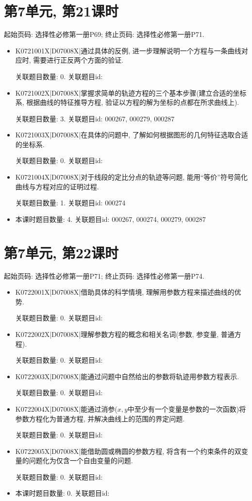 \section*{第7单元, 第21课时}
起始页码: 选择性必修第一册P69; 终止页码: 选择性必修第一册P71.
\begin{itemize}
\item K0721001X|D07008X|通过具体的反例, 进一步理解说明一个方程与一条曲线对应时, 需要进行正反两个方面的验证.

关联题目数量: 0. 关联题目id: 

\item K0721002X|D07008X|掌握求简单的轨迹方程的三个基本步骤(建立合适的坐标系, 根据曲线的特征推导方程, 验证以方程的解为坐标的点都在所求曲线上).

关联题目数量: 3. 关联题目id: 000267, 000279, 000287

\item K0721003X|D07008X|在具体的问题中, 了解如何根据图形的几何特征选取合适的坐标系.

关联题目数量: 0. 关联题目id: 

\item K0721004X|D07008X|对于线段的定比分点的轨迹等问题, 能用``等价''符号简化曲线与方程对应的证明过程.

关联题目数量: 1. 关联题目id: 000274

\item 本课时题目数量: 4. 关联题目id: 000267, 000274, 000279, 000287

\end{itemize}

\section*{第7单元, 第22课时}
起始页码: 选择性必修第一册P71; 终止页码: 选择性必修第一册P74.
\begin{itemize}
\item K0722001X|D07008X|借助具体的科学情境, 理解用参数方程来描述曲线的优势.

关联题目数量: 0. 关联题目id: 

\item K0722002X|D07008X|理解参数方程的概念和相关名词(参数, 参变量, 普通方程).

关联题目数量: 0. 关联题目id: 

\item K0722003X|D07008X|能通过问题中自然给出的参数将轨迹用参数方程表示.

关联题目数量: 0. 关联题目id: 

\item K0722004X|D07008X|能通过消参($x,y$中至少有一个变量是参数的一次函数)将参数方程化为普通方程, 并解决曲线上的范围的界定问题.

关联题目数量: 0. 关联题目id: 

\item K0722005X|D07008X|能借助圆或椭圆的参数方程, 将含有一个约束条件的双变量的问题化为仅含一个自由变量的问题.

关联题目数量: 0. 关联题目id: 

\item 本课时题目数量: 0. 关联题目id: 

\end{itemize}

